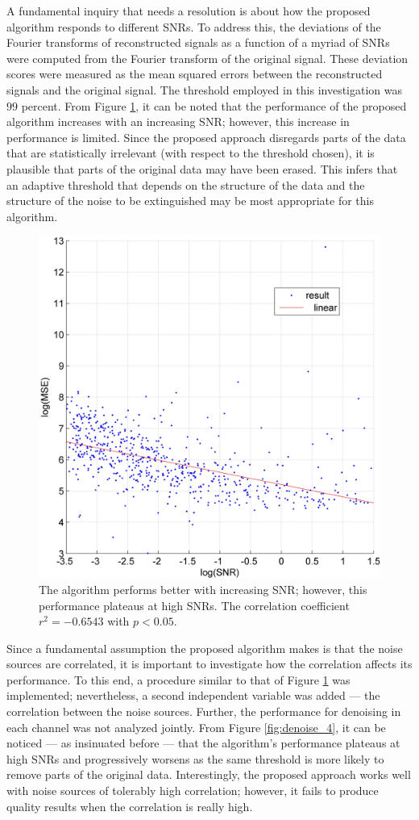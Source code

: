 \documentclass[onecolumn, groupedaddress, 10pt]{revtex4-1}
\begin{document}
A fundamental inquiry that needs a resolution is about how the proposed algorithm responds to different SNRs. To address this, the deviations of the Fourier transforms of reconstructed signals as a function of a myriad of SNRs were computed from the Fourier transform of the original signal. These deviation scores were measured as the mean squared errors between the reconstructed signals and the original signal. The threshold employed in this investigation was $99$ percent. From Figure \ref{fig:denoise_3}, it can be noted that the performance of the proposed algorithm increases with an increasing SNR; however, this increase in performance is limited. Since the proposed approach disregards parts of the data that are statistically irrelevant (with respect to the threshold chosen), it is plausible that parts of the original data may have been erased. This infers that an adaptive threshold that depends on the structure of the data and the structure of the noise to be extinguished may be most appropriate for this algorithm.

\begin{figure}[ht]
	\centering
  		\includegraphics[width=.5\linewidth]{denoise_3.jpg}
  		\caption{\label{fig:denoise_3} The algorithm performs better with increasing SNR; however, this performance plateaus at high SNRs. The correlation coefficient $r^2 = -0.6543$ with $p < 0.05$.}
\end{figure}


Since a fundamental assumption the proposed algorithm makes is that the noise sources are correlated, it is important to investigate how the correlation affects its performance. To this end, a procedure similar to that of Figure \ref{fig:denoise_3} was implemented; nevertheless, a second independent variable was added --- the correlation between the noise sources. Further, the performance for denoising in each channel was not analyzed jointly. From Figure \ref{fig:denoise_4}, it can be noticed --- as insinuated before --- that the algorithm's performance plateaus at high SNRs and progressively worsens as the same threshold is more likely to remove parts of the original data. Interestingly, the proposed approach works well with noise sources of tolerably high correlation; however, it fails to produce quality results when the correlation is really high.
\end{document}
